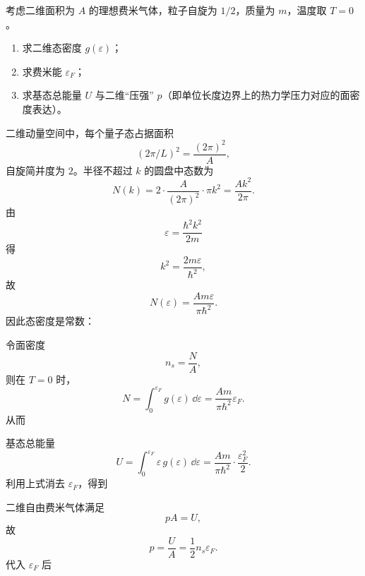 \begin{question}[20分]
考虑二维面积为 $A$ 的理想费米气体，粒子自旋为 $1/2$，质量为 $m$，温度取 $T=0$。
\begin{enumerate}[label=(\arabic*),leftmargin=2.8em,itemsep=0.2em]
\item 求二维态密度 $g(\varepsilon)$；
\item 求费米能 $\varepsilon_F$；
\item 求基态总能量 $U$ 与二维“压强” $p$（即单位长度边界上的热力学压力对应的面密度表达）。
\end{enumerate}
\begin{solution}

二维动量空间中，每个量子态占据面积
\[
(2\pi/L)^2=\frac{(2\pi)^2}{A},
\]
自旋简并度为 $2$。半径不超过 $k$ 的圆盘中态数为
\[
N(k)=2\cdot \frac{A}{(2\pi)^2}\cdot \pi k^2=\frac{Ak^2}{2\pi}.
\]
由
\[
\varepsilon=\frac{\hbar^2k^2}{2m}
\]
得
\[
k^2=\frac{2m\varepsilon}{\hbar^2},
\]
故
\[
N(\varepsilon)=\frac{Am\varepsilon}{\pi\hbar^2}.
\]
因此态密度是常数：

令面密度
\[
n_s=\frac{N}{A},
\]
则在 $T=0$ 时，
\[
N=\int_0^{\varepsilon_F}g(\varepsilon)\,\dd{\varepsilon}
=\frac{Am}{\pi\hbar^2}\varepsilon_F.
\]
从而

基态总能量
\[
U=\int_0^{\varepsilon_F}\varepsilon\,g(\varepsilon)\,\dd{\varepsilon}
=\frac{Am}{\pi\hbar^2}\cdot \frac{\varepsilon_F^2}{2}.
\]
利用上式消去 $\varepsilon_F$，得到

二维自由费米气体满足
\[
pA=U,
\]
故
\[
p=\frac{U}{A}=\frac12 n_s\varepsilon_F.
\]
代入 $\varepsilon_F$ 后
\end{solution}
\end{question}

